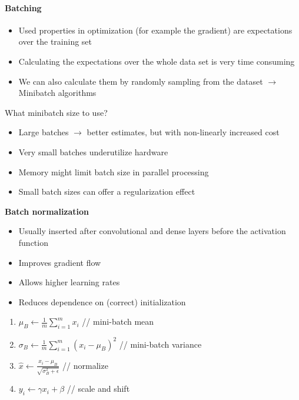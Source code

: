 \paragraph{Batching}
\begin{itemize}
    \item Used properties in optimization (for example the gradient) are expectations over the training set
    \item Calculating the expectations over the whole data set is very time consuming
    \item We can also calculate them by randomly sampling from the dataset $\rightarrow$ Minibatch algorithms
\end{itemize}
What minibatch size to use?
\begin{itemize}
    \item Large batches $\rightarrow$ better estimates, but with non-linearly increased cost
    \item Very small batches underutilize hardware
    \item Memory might limit batch size in parallel processing
    \item Small batch sizes can offer a regularization effect
\end{itemize}
\textbf{Batch normalization}

\begin{minipage}{0.525\textwidth}
    \begin{itemize}
        \item Usually inserted after convolutional and dense layers before the activation function
        \item Improves gradient flow
        \item Allows higher learning rates
        \item Reduces dependence on (correct) initialization
    \end{itemize}
\end{minipage}
\begin{minipage}{0.475\textwidth}
    \begin{enumerate}
        \item $\mu_B \leftarrow \frac{1}{m}\sum_{i=1}^m x_i$ // mini-batch mean
        \item $\sigma_B \leftarrow \frac{1}{m}\sum_{i=1}^m (x_i-\mu_B)^2$ // mini-batch variance
        \item $\hat{x} \leftarrow \frac{x_i - \mu_B}{\sqrt{\sigma_B^2+\epsilon}}$ // normalize
        \item $y_i \leftarrow \gamma x_i + \beta$ // scale and shift
    \end{enumerate}
\end{minipage}

